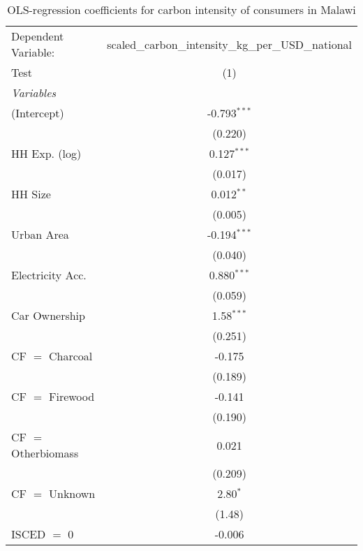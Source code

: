 
\begin{table}[htbp!]
   \centering
   \small
   \begin{adjustbox}{width = 1\textwidth, max height = 0.95\textheight, center}
      \begin{threeparttable}[b]
         \caption{\label{tab:OLS_1_MWI} OLS-regression coefficients for carbon intensity of consumers in Malawi}
         \begin{tabular}{lc}
            \tabularnewline \midrule \midrule
            Dependent Variable: & scaled\_carbon\_intensity\_kg\_per\_USD\_national\\        
            Test                & (1)\\  
            \midrule
            \emph{Variables}\\
            (Intercept)         & -0.793$^{***}$\\   
                                & (0.220)\\   
            HH Exp. (log)       & 0.127$^{***}$\\   
                                & (0.017)\\   
            HH Size             & 0.012$^{**}$\\   
                                & (0.005)\\   
            Urban Area          & -0.194$^{***}$\\   
                                & (0.040)\\   
            Electricity Acc.    & 0.880$^{***}$\\   
                                & (0.059)\\   
            Car Ownership       & 1.58$^{***}$\\   
                                & (0.251)\\   
            CF $=$ Charcoal     & -0.175\\   
                                & (0.189)\\   
            CF $=$ Firewood     & -0.141\\   
                                & (0.190)\\   
            CF $=$ Otherbiomass & 0.021\\   
                                & (0.209)\\   
            CF $=$ Unknown      & 2.80$^{*}$\\   
                                & (1.48)\\   
            ISCED $=$ 0         & -0.006\\   

\end{tabular}
\end{threeparttable}
\end{adjustbox}
\end{table}
